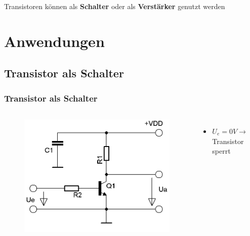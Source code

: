 \begin{frame}
\begin{columns}
\begin{center}
\begin{figure}
      \end{figure}
    \end{center}
  \end{columns}
  Transistoren können als \textbf{Schalter} oder als \textbf{Verstärker} genutzt werden
\end{frame}

\section*{Anwendungen}
\subsection*{Transistor als Schalter}
\begin{frame}
  \frametitle{Transistor als Schalter}
  \begin{columns}
    \begin{center}
      \begin{figure}
        \includegraphics[width=\textwidth,height=.85\textheight,keepaspectratio]{a06/Transistor-Schalter.png}
      \end{figure}
    \end{center}
    \begin{itemize}
      \item $U_e = 0 V \rightarrow$ Transistor sperrt\\

\end{itemize}
\end{columns}
\end{frame}
